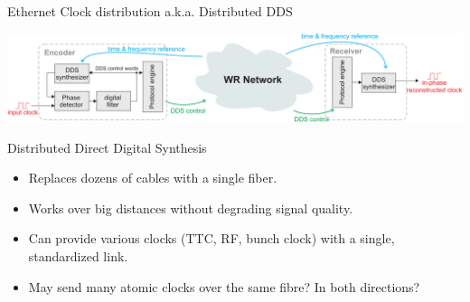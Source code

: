 \documentclass[compress,red]{beamer}
\begin{document}
\begin{frame}{Ethernet Clock distribution a.k.a. Distributed DDS}
  \begin{center}
    \includegraphics[width=\columnwidth]{applications/remote_dds.pdf}
  \end{center}
  \begin{block}{Distributed Direct Digital Synthesis}
    \begin{itemize}
    \item Replaces dozens of cables with a single fiber.
    \item Works over big distances without degrading signal quality.
    \item Can provide various clocks (TTC, RF, bunch clock) with a single, standardized link.
    \item May send many atomic clocks over the same fibre? In both directions?
    \end{itemize}
  \end{block}
\end{frame}



\end{document}
